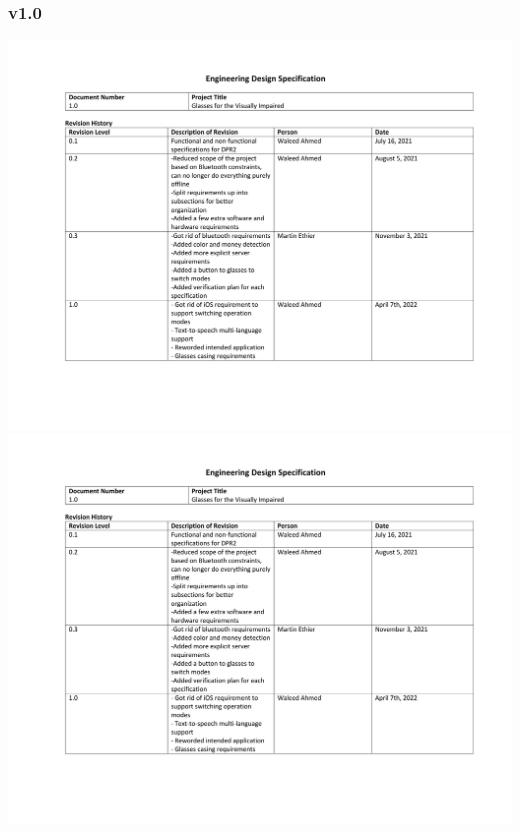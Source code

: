 \documentclass[a4paper,11pt]{article}
\begin{document}
\begin{landscape}
        \newpage

    \subsubsection{v1.0}
    \label{eds-1.0}
    \begin{center}
        \includegraphics[page=1,width={0.86\linewidth}]{pdf/eds_1.0.pdf}
        \newpage
        \includegraphics[page=2,width={0.86\linewidth}]{pdf/eds_1.0.pdf}
        \newpage

\end{center}
\end{landscape}
\end{document}

